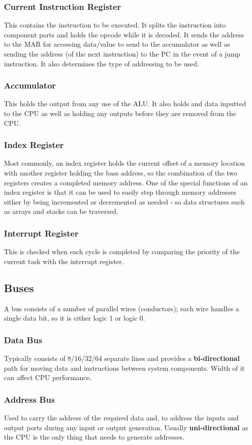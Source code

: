 \documentclass[a4paper,11pt, twocolumn]{article}
\begin{document}
\subsubsection{Current Instruction Register}
This contains the instruction to be executed. It splits the instruction into component parts and holds the opcode while it is decoded. It sends the address to the MAR for accessing data/value to send to the accumulator as well as sending the address (of the next instruction) to the PC in the event of a jump instruction. It also determines the type of addressing to be used.
\subsubsection{Accumulator}
This holds the output from any use of the ALU. It also holds and data inputted to the CPU as well as holding any outputs before they are removed from the CPU.
\subsubsection{Index Register}
Most commonly, an index register holds the current offset of a memory location with another register holding the bass address, so the combination of the two registers creates a completed memory address. One of the special functions of an index register is that it can be used to easily step through memory addresses either by being incremented or decremented as needed - so data structures such as arrays and stacks can be traversed.
\subsubsection{Interrupt Register}
This is checked when each cycle is completed by comparing the priority of the current task with the interrupt register.
\subsection{Buses}
A bus consists of a number of parallel wires (conductors); each wire handles a single data bit, so it is either logic 1 or logic 0.
\subsubsection{Data Bus}
Typically consists of 8/16/32/64 separate lines and provides a \textbf{bi-directional} path for moving data and instructions between system components. Width of it can affect CPU performance.
\subsubsection{Address Bus}
Used to carry the address of the required data and, to address the inputs and output ports during any input or output generation. Usually \textbf{uni-directional} as the CPU is the only thing that needs to generate addresses.
\end{document}
